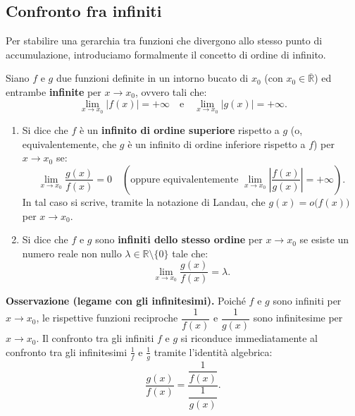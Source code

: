 \subsection{Confronto fra infiniti}

Per stabilire una gerarchia tra funzioni che divergono allo stesso punto di accumulazione, introduciamo formalmente il concetto di ordine di infinito.

\begin{defbox}
Siano $f$ e $g$ due funzioni definite in un intorno bucato di $x_0$ (con $x_0 \in \overline{\mathbb{R}}$) ed entrambe \textbf{infinite} per $x \to x_0$, ovvero tali che:
\[
    \lim_{x \to x_0} |f(x)| = +\infty \quad \text{e} \quad \lim_{x \to x_0} |g(x)| = +\infty.
\]
\begin{enumerate}
    \item Si dice che $f$ è un \textbf{infinito di ordine superiore} rispetto a $g$ (o, equivalentemente, che $g$ è un infinito di ordine inferiore rispetto a $f$) per $x \to x_0$ se:
    \[
        \lim_{x \to x_0} \frac{g(x)}{f(x)} = 0 \quad \left(\text{oppure equivalentemente } \lim_{x \to x_0} \left|\frac{f(x)}{g(x)}\right| = +\infty\right).
    \]
    In tal caso si scrive, tramite la notazione di Landau, che $g(x) = o\bigl(f(x)\bigr)$ per $x \to x_0$.

    \item Si dice che $f$ e $g$ sono \textbf{infiniti dello stesso ordine} per $x \to x_0$ se esiste un numero reale non nullo $\lambda \in \mathbb{R} \setminus \{0\}$ tale che:
    \[
        \lim_{x \to x_0} \frac{g(x)}{f(x)} = \lambda.
    \]
\end{enumerate}
\end{defbox}

\noindent\textbf{Osservazione (legame con gli infinitesimi).} Poiché $f$ e $g$ sono infiniti per $x \to x_0$, le rispettive funzioni reciproche $\dfrac{1}{f(x)}$ e $\dfrac{1}{g(x)}$ sono infinitesime per $x \to x_0$. Il confronto tra gli infiniti $f$ e $g$ si riconduce immediatamente al confronto tra gli infinitesimi $\frac{1}{f}$ e $\frac{1}{g}$ tramite l'identità algebrica:
\[
    \frac{g(x)}{f(x)} = \frac{\dfrac{1}{f(x)}}{\dfrac{1}{g(x)}}.
\]

